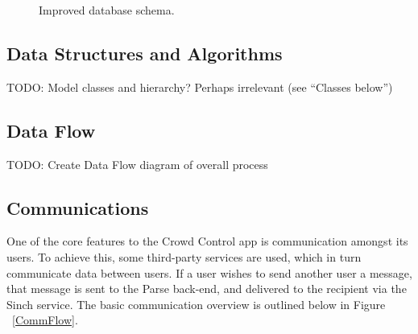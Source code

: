 	\begin{figure}[tbh!]
	\begin{center}
	\end{center}
	\caption{Improved database schema. \label{MidDBSchema}}
	\end{figure}

 \subsection{Data Structures and Algorithms}
 TODO: Model classes and hierarchy? Perhaps irrelevant (see ``Classes below'')
 
 \subsection{Data Flow}
 TODO: Create Data Flow diagram of overall process
 
 
 \subsection{Communications}
 One of the core features to the Crowd Control app is communication amongst its users. To achieve this, some third-party services are used, which in turn communicate data between users. If a user wishes to send another user a message, that message is sent to the Parse back-end, and delivered to the recipient via the Sinch service. The basic communication overview is outlined below in Figure ~\ref{CommFlow}.
 
